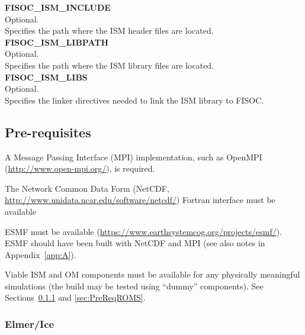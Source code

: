 \documentclass[12pt]{article}
\begin{document}
\begin{flushleft}
\textbf{FISOC\_ISM\_INCLUDE}                       \\ 
Optional.                                          \\
Specifies the path where the ISM header files are located.\\
\vspace{6pt}
\textbf{FISOC\_ISM\_LIBPATH}                       \\
Optional.                                          \\
Specifies the path where the ISM library files are located.\\
\vspace{6pt}
\textbf{FISOC\_ISM\_LIBS}                          \\
Optional.                                          \\
Specifies the linker directives needed to link the ISM library to FISOC. \\
\end{flushleft}



\subsection{Pre-requisites}
\label{sec:PreReq}

A Message Passing Interface (MPI) implementation, such as 
OpenMPI (\url{http://www.open-mpi.org/}), is required. 

The Network Common Data Form (NetCDF,  
\url{http://www.unidata.ucar.edu/software/netcdf/}) 
Fortran interface must be available 

ESMF must be available (\url{https://www.earthsystemcog.org/projects/esmf/}).  
ESMF should have been built with NetCDF and MPI 
(see also notes in Appendix~\ref{app:A}).


Viable ISM and OM components must be available for any physically meaningful simulations
(the build may be tested using ``dummy'' components).  
See Sections~\ref{sec:PreReqElmer} and \ref{sec:PreReqROMS}.

\subsubsection{Elmer/Ice}
\label{sec:PreReqElmer}
\end{document}
